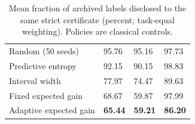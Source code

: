 \begin{table}[t]
\centering\small{}\setlength{\tabcolsep}{3.5pt}
\caption{Mean fraction of archived labels disclosed to the same strict certificate (percent; task-equal weighting). Policies are classical controls.}
\label{tab:disclosurepolicies}
\begin{tabularx}{\textwidth}{@{}XN{0.16\textwidth}N{0.16\textwidth}N{0.18\textwidth}@{}}
\toprule
{} &  &  & \\\midrule
Random (50 seeds) & 95.76 & 95.16 & 97.73\\
Predictive entropy & 92.15 & 90.15 & 98.83\\
Interval width & 77.97 & 74.47 & 89.63\\
Fixed expected gain & 68.67 & 59.87 & 97.99\\
Adaptive expected gain & \textbf{65.44} & \textbf{59.21} & \textbf{86.20}\\
\bottomrule
\end{tabularx}
\end{table}
